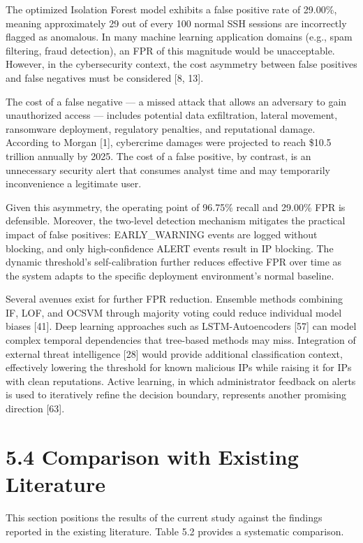 \documentclass[
  a4paper]{report}
\begin{document}
The optimized Isolation Forest model exhibits a false positive rate of
29.00\%, meaning approximately 29 out of every 100 normal SSH sessions
are incorrectly flagged as anomalous. In many machine learning
application domains (e.g., spam filtering, fraud detection), an FPR of
this magnitude would be unacceptable. However, in the cybersecurity
context, the cost asymmetry between false positives and false negatives
must be considered {[}8, 13{]}.

The cost of a false negative --- a missed attack that allows an
adversary to gain unauthorized access --- includes potential data
exfiltration, lateral movement, ransomware deployment, regulatory
penalties, and reputational damage. According to Morgan {[}1{]},
cybercrime damages were projected to reach \$10.5 trillion annually by
2025. The cost of a false positive, by contrast, is an unnecessary
security alert that consumes analyst time and may temporarily
inconvenience a legitimate user.

Given this asymmetry, the operating point of 96.75\% recall and 29.00\%
FPR is defensible. Moreover, the two-level detection mechanism mitigates
the practical impact of false positives: EARLY\_WARNING events are
logged without blocking, and only high-confidence ALERT events result in
IP blocking. The dynamic threshold's self-calibration further reduces
effective FPR over time as the system adapts to the specific deployment
environment's normal baseline.

Several avenues exist for further FPR reduction. Ensemble methods
combining IF, LOF, and OCSVM through majority voting could reduce
individual model biases {[}41{]}. Deep learning approaches such as
LSTM-Autoencoders {[}57{]} can model complex temporal dependencies that
tree-based methods may miss. Integration of external threat intelligence
{[}28{]} would provide additional classification context, effectively
lowering the threshold for known malicious IPs while raising it for IPs
with clean reputations. Active learning, in which administrator feedback
on alerts is used to iteratively refine the decision boundary,
represents another promising direction {[}63{]}.

\section{5.4 Comparison with Existing
Literature}\label{comparison-with-existing-literature}

This section positions the results of the current study against the
findings reported in the existing literature. Table 5.2 provides a
systematic comparison.
\end{document}
